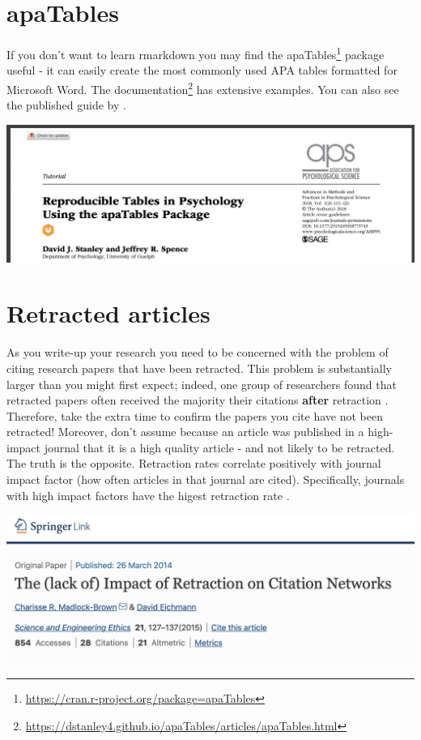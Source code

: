 \documentclass[
]{krantz}
\renewcommand{\href}[2]{#2\footnote{\url{#1}}}
\begin{document}
\hypertarget{apatables}{%
\section{apaTables}\label{apatables}}

If you don't want to learn rmarkdown you may find the \href{https://cran.r-project.org/package=apaTables}{apaTables} package useful - it can easily create the most commonly used APA tables formatted for Microsoft Word. The \href{https://dstanley4.github.io/apaTables/articles/apaTables.html}{documentation} has extensive examples. You can also see the published guide by \citet{stanley2018reproducible}.

\includegraphics[width=0.6\linewidth]{ch_tools/images/apaTables_paper}

\hypertarget{retracted-articles}{%
\section{Retracted articles}\label{retracted-articles}}

As you write-up your research you need to be concerned with the problem of citing research papers that have been retracted. This problem is substantially larger than you might first expect; indeed, one group of researchers found that retracted papers often received the majority their citations \textbf{after} retraction \citep{madlock2015lack}. Therefore, take the extra time to confirm the papers you cite have not been retracted! Moreover, don't assume because an article was published in a high-impact journal that it is a high quality article - and not likely to be retracted. The truth is the opposite. Retraction rates correlate positively with journal impact factor (how often articles in that journal are cited). Specifically, journals with high impact factors have the higest retraction rate \citep{fang2011retracted}.

\includegraphics[width=0.6\linewidth]{ch_tools/images/retract_impact}
\end{document}
